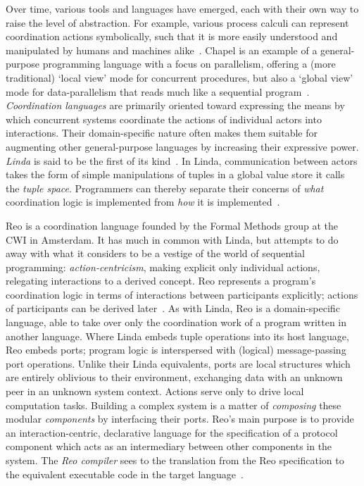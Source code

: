 Over time, various tools and languages have emerged, each with their own way to raise the level of abstraction. For example, various process calculi can represent coordination actions symbolically, such that it is more easily understood and manipulated by humans and machines alike~\cite{arbab2011puff}. Chapel is an example of a general-purpose programming language with a focus on parallelism, offering a (more traditional) `local view' mode for concurrent procedures, but also a `global view' mode for data-parallelism that reads much like a sequential program~\cite{chamberlain2007parallel}.
\textit{Coordination languages} are primarily oriented toward expressing the means by which concurrent systems coordinate the actions of individual actors into interactions. Their domain-specific nature often makes them suitable for augmenting other general-purpose languages by increasing their expressive power. \textit{Linda} is said to be the first of its kind~\cite{wells2005coordination}. In Linda, communication between actors takes the form of simple manipulations of tuples in a global value store it calls the \textit{tuple space}. Programmers can thereby separate their concerns of \textit{what} coordination logic is implemented from \textit{how} it is implemented~\cite{gelernter1992coordination}.

Reo is a coordination language founded by the Formal Methods group at the CWI in Amsterdam. It has much in common with Linda, but attempts to do away with what it considers to be a vestige of the world of sequential programming: \textit{action-centricism}, making explicit only individual actions, relegating interactions to a derived concept. Reo represents a program's coordination logic in terms of interactions between participants explicitly; actions of participants can be derived later~\cite{arbab2011puff}. As with Linda, Reo is a domain-specific language, able to take over only the coordination work of a program written in another language. Where Linda embeds tuple operations into its host language, Reo embeds ports; program logic is interspersed with (logical) message-passing port operations. Unlike their Linda equivalents, ports are local structures which are entirely oblivious to their environment, exchanging data with an unknown peer in an unknown system context. Actions serve only to drive local computation tasks. Building a complex system is a matter of \textit{composing} these modular \textit{components} by interfacing their ports. Reo's main purpose is to provide an interaction-centric, declarative language for the specification of a protocol component which acts as an intermediary between other components in the system. The \textit{Reo compiler} sees to the translation from the Reo specification to the equivalent executable code in the target language~\cite{arbab2011puff}.

